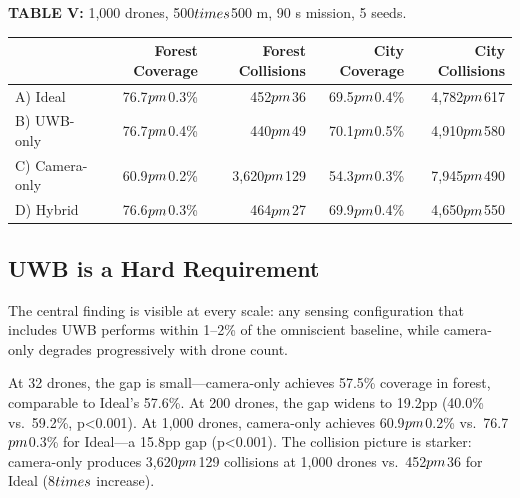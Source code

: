 \documentclass[conference]{IEEEtran}
\begin{document}
\textbf{TABLE V:} 1,000 drones, 500$\\times$500 m, 90 s mission, 5 seeds.

{\def\LTcaptype{none} %
\begin{longtable}[]{@{}lrrrr@{}}
\toprule\noalign{}
& Forest Coverage & Forest Collisions & City Coverage & City
Collisions \\
\midrule\noalign{}
\endhead
\bottomrule\noalign{}
\endlastfoot
A) Ideal & 76.7$\\pm$0.3\% & 452$\\pm$36 & 69.5$\\pm$0.4\% & 4,782$\\pm$617 \\
B) UWB-only & 76.7$\\pm$0.4\% & 440$\\pm$49 & 70.1$\\pm$0.5\% & 4,910$\\pm$580 \\
C) Camera-only & 60.9$\\pm$0.2\% & 3,620$\\pm$129 & 54.3$\\pm$0.3\% & 7,945$\\pm$490 \\
D) Hybrid & 76.6$\\pm$0.3\% & 464$\\pm$27 & 69.9$\\pm$0.4\% & 4,650$\\pm$550 \\
\end{longtable}
}

\subsection{UWB is a Hard Requirement}\label{b.-uwb-is-a-hard-requirement}

The central finding is visible at every scale: any sensing configuration
that includes UWB performs within 1--2\% of the omniscient baseline,
while camera-only degrades progressively with drone count.

At 32 drones, the gap is small---camera-only achieves 57.5\% coverage in
forest, comparable to Ideal's 57.6\%. At 200 drones, the gap widens to
19.2pp (40.0\% vs.~59.2\%, p\textless0.001). At 1,000 drones,
camera-only achieves 60.9$\\pm$0.2\% vs.~76.7$\\pm$0.3\% for Ideal---a 15.8pp gap
(p\textless0.001). The collision picture is starker: camera-only
produces 3,620$\\pm$129 collisions at 1,000 drones vs.~452$\\pm$36 for Ideal (8$\\times$
increase).
\end{document}
